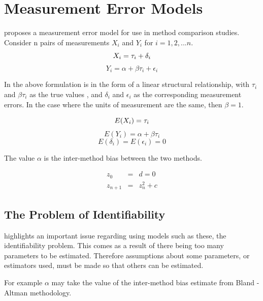 \documentclass[12pt, a4paper]{report}
\theoremstyle{plain}
\theoremstyle{definition}
\theoremstyle{remark}
\begin{document}
\section{Measurement Error Models}

\citet{DunnSEME} proposes a measurement error model for use in
method comparison studies. Consider n pairs of measurements
$X_{i}$ and $Y_{i}$ for $i=1,2,...n$.
\begin{equation}
X_{i} = \tau_{i}+\delta_{i}\\
\end{equation}
\begin{equation}
Y_{i} = \alpha +\beta\tau_{i}+\epsilon_{i} \nonumber
\end{equation}

In the above formulation is in the form of a linear structural
relationship, with $\tau_{i}$ and $\beta\tau_{i}$ as the true
values , and $\delta_{i}$ and $\epsilon_{i}$ as the corresponding
measurement errors. In the case where the units of measurement are
the same, then $\beta =1$.

\begin{equation}
E(X_{i}) = \tau_{i}\\
\end{equation}
\begin{equation}
E(Y_{i}) = \alpha +\beta\tau_{i} \nonumber
\end{equation}
\begin{equation}
E(\delta_{i}) = E(\epsilon_{i}) = 0 \nonumber
\end{equation}

The value $\alpha$ is the inter-method bias between the two
methods.


\begin{eqnarray}
z_0 &=& d = 0 \\
z_{n+1} &=& z_n^2+c
\end{eqnarray}


	
\subsection{The Problem of Identifiability}
\citet{DunnSEME} highlights an important issue regarding using
models such as these, the identifiability problem. This comes as a
result of there being too many parameters to be estimated.
Therefore assumptions about some parameters, or estimators used,
must be made so that others can be estimated. 

For example $\alpha$
may take the value of the inter-method bias estimate from Bland -
Altman methodology. 
\end{document}
